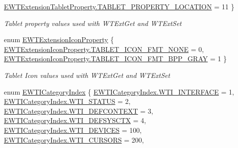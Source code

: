 \begin{DoxyCompactItemize}
\mbox{\hyperlink{namespace_wintab_d_n_a21cb408997e6cbe0866e75b0fe0a743fa24f7e0ec25355bf64201e8dfb537ea07}{E\+W\+T\+Extension\+Tablet\+Property.\+T\+A\+B\+L\+E\+T\+\_\+\+P\+R\+O\+P\+E\+R\+T\+Y\+\_\+\+L\+O\+C\+A\+T\+I\+ON}} = 11
 \}
\begin{DoxyCompactList}\small\item\em Tablet property values used with W\+T\+Ext\+Get and W\+T\+Ext\+Set \end{DoxyCompactList}\item 
enum \mbox{\hyperlink{namespace_wintab_d_n_a4fb4432ff158db77a634fed851e23f6f}{E\+W\+T\+Extension\+Icon\+Property}} \{ \mbox{\hyperlink{namespace_wintab_d_n_a4fb4432ff158db77a634fed851e23f6fa0446c21253fe697ee3b277098ba4bb31}{E\+W\+T\+Extension\+Icon\+Property.\+T\+A\+B\+L\+E\+T\+\_\+\+I\+C\+O\+N\+\_\+\+F\+M\+T\+\_\+\+N\+O\+NE}} = 0, 
\mbox{\hyperlink{namespace_wintab_d_n_a4fb4432ff158db77a634fed851e23f6fab9a6d62298bf4bc839441b64575f1ddf}{E\+W\+T\+Extension\+Icon\+Property.\+T\+A\+B\+L\+E\+T\+\_\+\+I\+C\+O\+N\+\_\+\+F\+M\+T\+\_\+B\+P\+P\+\_\+\+G\+R\+AY}} = 1
 \}
\begin{DoxyCompactList}\small\item\em Tablet Icon values used with W\+T\+Ext\+Get and W\+T\+Ext\+Set \end{DoxyCompactList}\item 
enum \mbox{\hyperlink{namespace_wintab_d_n_aeb27579e91c95fb5a7bf4a4a9dc7f875}{E\+W\+T\+I\+Category\+Index}} \{ \newline
\mbox{\hyperlink{namespace_wintab_d_n_aeb27579e91c95fb5a7bf4a4a9dc7f875ac65fabfb07e834f30a3afca244a04042}{E\+W\+T\+I\+Category\+Index.\+W\+T\+I\+\_\+\+I\+N\+T\+E\+R\+F\+A\+CE}} = 1, 
\mbox{\hyperlink{namespace_wintab_d_n_aeb27579e91c95fb5a7bf4a4a9dc7f875aa20fa5b0815fd2a7092a5d7889b1022f}{E\+W\+T\+I\+Category\+Index.\+W\+T\+I\+\_\+\+S\+T\+A\+T\+US}} = 2, 
\mbox{\hyperlink{namespace_wintab_d_n_aeb27579e91c95fb5a7bf4a4a9dc7f875a16d13b61cd342e276a42402d6923855a}{E\+W\+T\+I\+Category\+Index.\+W\+T\+I\+\_\+\+D\+E\+F\+C\+O\+N\+T\+E\+XT}} = 3, 
\mbox{\hyperlink{namespace_wintab_d_n_aeb27579e91c95fb5a7bf4a4a9dc7f875a6c5be5d5af8ebdf5c21b30c93485c850}{E\+W\+T\+I\+Category\+Index.\+W\+T\+I\+\_\+\+D\+E\+F\+S\+Y\+S\+C\+TX}} = 4, 
\newline
\mbox{\hyperlink{namespace_wintab_d_n_aeb27579e91c95fb5a7bf4a4a9dc7f875a5a63ac9350330d363b4f38184ed39ed8}{E\+W\+T\+I\+Category\+Index.\+W\+T\+I\+\_\+\+D\+E\+V\+I\+C\+ES}} = 100, 
\mbox{\hyperlink{namespace_wintab_d_n_aeb27579e91c95fb5a7bf4a4a9dc7f875a222bda6407f41864cdde9329e2174f12}{E\+W\+T\+I\+Category\+Index.\+W\+T\+I\+\_\+\+C\+U\+R\+S\+O\+RS}} = 200, 

\end{DoxyCompactItemize}
